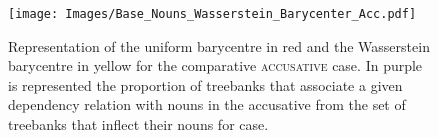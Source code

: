 \begin{figure}[h!]
    \centering
    \texttt{[image: Images/Base\_Nouns\_Wasserstein\_Barycenter\_Acc.pdf]}
    \caption{Representation of the uniform barycentre in red and the Wasserstein barycentre in yellow for the comparative \textsc{accusative} case.
    In purple is represented the proportion of treebanks that associate a given dependency relation with nouns in the accusative from the set of treebanks that inflect their nouns for case.}
    \label{fig:prototypes}
\end{figure}



